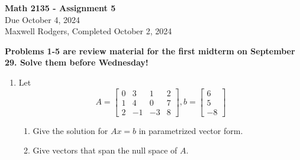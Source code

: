 \documentclass[12pt,a4paper]{amsart}
\newcommand{\vd}[3]{\left[\begin{matrix} #1 \\ #2 \\ #3 \end{matrix}\right]}
\begin{document}
\begin{center}
{\Large\textbf{Math 2135 - Assignment 5}}\\
\medskip
Due October 4, 2024 \\
\smallskip
Maxwell Rodgers, Completed October 2, 2024
\smallskip
\end{center}
\thispagestyle{empty}


{\bf Problems 1-5 are review material for the first midterm on September 29. Solve them before Wednesday!}


\begin{enumerate}
\item
 Let
\[ A = \left[\begin{matrix} 0 & 3 & 1 & 2 \\ 1 & 4 & 0 & 7 \\ 2 & -1 & -3 & 8 \end{matrix}\right], b = \vd{6}{5}{-8} \]
\begin{enumerate}
\item Give the solution for $Ax=b$ in parametrized vector form.
\item Give vectors that span the null space of $A$.
\end{enumerate}


\end{enumerate}
\end{document}
